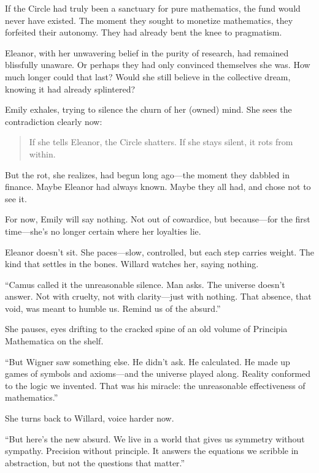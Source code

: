 If the Circle had truly been a sanctuary for pure mathematics, the fund would never have existed. The moment they sought to monetize mathematics, they forfeited their autonomy. They had already bent the knee to pragmatism.

\smallskip

Eleanor, with her unwavering belief in the purity of research, had remained blissfully unaware. Or perhaps they had only convinced themselves she was. How much longer could that last? Would she still believe in the collective dream, knowing it had already splintered?

\smallskip

Emily exhales, trying to silence the churn of her (owned) mind. She sees the contradiction clearly now:

\begin{quote}
If she tells Eleanor, the Circle shatters.
If she stays silent, it rots from within.
\end{quote}

But the rot, she realizes, had begun long ago—the moment they dabbled in finance.
Maybe Eleanor had always known.
Maybe they all had, and chose not to see it.

For now, Emily will say nothing.
Not out of cowardice, but because—for the first time—she’s no longer certain where her loyalties lie.

Eleanor doesn’t sit. She paces—slow, controlled, but each step carries weight. The kind that settles in the bones. Willard watches her, saying nothing.

“Camus called it the unreasonable silence. Man asks. The universe doesn’t answer. Not with cruelty, not with clarity—just with nothing. That absence, that void, was meant to humble us. Remind us of the absurd.”

She pauses, eyes drifting to the cracked spine of an old volume of Principia Mathematica on the shelf.

“But Wigner saw something else. He didn’t ask. He calculated. He made up games of symbols and axioms—and the universe played along. Reality conformed to the logic we invented. That was his miracle: the unreasonable effectiveness of mathematics.”

She turns back to Willard, voice harder now.

“But here’s the new absurd. We live in a world that gives us symmetry without sympathy. Precision without principle. It answers the equations we scribble in abstraction, but not the questions that matter.”

